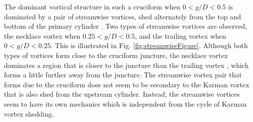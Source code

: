 \documentclass[oneside]{utmthesis}
\begin{document}
The dominant vortical structure in such a cruciform when $0 < g/D < 0.5$ is dominated by a pair of streamwise vortices, shed alternately from the top and bottom of the primary cylinder \citep{Koide2017}. Two types of streamwise vortices are observed, the necklace vortex when $0.25 < g/D < 0.5$, and the trailing vortex when $0 < g/D < 0.25$. This is illustrated in Fig. \ref{fig:streamwiseFigure}. Although both types of vortices form close to the cruciform juncture, the necklace vortex dominates a region that is closer to the juncture than the trailing vortex \citep{Takahashi1999}, which forms a little further away from the juncture. The streamwise vortex pair that forms due to the cruciform does not seem to be secondary to the Karman vortex that is also shed from the upstream cylinder. Instead, the streamwise vortices seem to have its own mechanics which is independent from the cycle of Karman vortex shedding.
\end{document}
